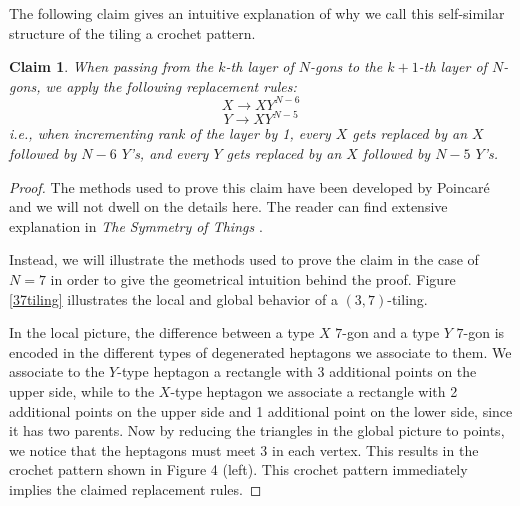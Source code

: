 \documentclass[11pt, oneside]{article}   	%
\newtheorem{claim}{Claim}
\begin{document}
The following claim gives an intuitive explanation of why we  call this self-similar structure of the tiling a crochet pattern.
\begin{claim}
When passing from the $k$-th layer of $N$-gons to the $k+1$-th layer of $N$-gons, we apply the following replacement rules:
\[X\to XY^{N-6} \]
\[ Y\to  XY^{N-5} \]
i.e., when incrementing rank of the layer by 1, every $X$ gets replaced by an $X$ followed by $N-6$ $Y$'s, and every $Y$ gets replaced by an $X$ followed by $N-5$ $Y$'s.
\end{claim}

\begin{proof}
The methods used to prove this claim have been developed by Poincar\'{e} and we will not dwell on the details here. The reader can find extensive explanation in \textit{The Symmetry of Things} \cite{symm}.

Instead, we will illustrate the methods used to prove the claim in the case of $N=7$ in order to give the geometrical intuition behind the proof. Figure \ref{37tiling} illustrates the local and global behavior of a $(3,7)$-tiling. 

In the local picture, the difference between a type $X$ $7$-gon and a type $Y$ $7$-gon is encoded in the different types of degenerated heptagons we associate to them. We associate to the $Y$-type heptagon a rectangle with 3 additional points  on the upper side, while to the $X$-type heptagon we associate a rectangle with 2 additional points on the upper side and 1 additional point on the lower side, since it has two parents. Now by reducing the triangles in the global picture to points, we notice that the heptagons must meet 3 in each vertex. This results in the crochet pattern shown in Figure 4 (left). This crochet pattern immediately implies the claimed replacement rules.  
\end{proof}
\end{document}
